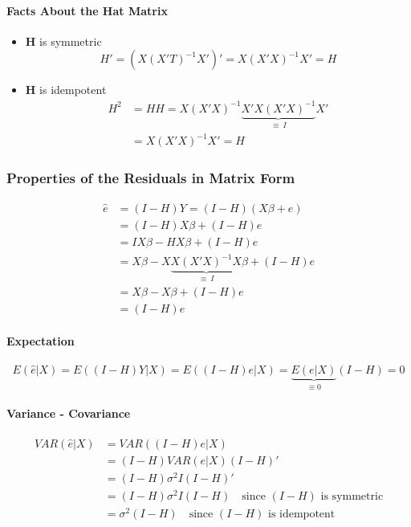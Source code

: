 \documentclass[10pt]{article}
\begin{document}
\paragraph{Facts About the Hat Matrix}
\begin{itemize}
    \item $\mathbf{H}$ is symmetric
        \begin{equation*}
            H' = (X(X'T)^{-1}X')' = X(X'X)^{-1}X' = H
        \end{equation*}
    \item $\mathbf{H}$ is idempotent
        \begin{align*}
            H^2 &= HH =  X(X'X)^{-1} \underbrace{X' X(X'X)^{-1}}_{\equiv ~I}X' \\
            &=  X(X'X)^{-1}X' = H
        \end{align*}
\end{itemize}

\subsubsection{Properties of the Residuals in Matrix Form}
\begin{align*}
    \hat{e} &= (I - H)Y = (I - H)(X\beta + e) \\
    &= (I - H)X\beta + (I - H)e \\
    &= IX\beta - HX\beta + (I - H)e \\
    &= X\beta - X\underbrace{X(X'X)^{-1}X}_{\equiv ~I} \beta + (I - H)e \\
    &= X\beta - X\beta + (I - H)e \\
    &= (I - H)e
\end{align*}
\paragraph{Expectation}
\begin{equation*}
    E(\hat{e}| X) = E((I - H)Y | X) = E((I - H)e | X) = \underbrace{E(e|X)}_{\equiv 0}(I - H) = 0
\end{equation*}

\paragraph{Variance - Covariance}
\begin{align*}
    VAR(\hat{e}|X) &= VAR((I-H)e|X) \\
    &= (I - H) VAR(e|X) (I - H)' \\
    &= (I - H) \sigma^2 I (I - H) '\\
    &= (I - H) \sigma^2 I (I - H) \quad \text{since $(I - H)$ is symmetric} \\
    &= \sigma^2 (I - H) \quad \text{since $(I - H)$ is idempotent}
\end{align*}
\end{document}
